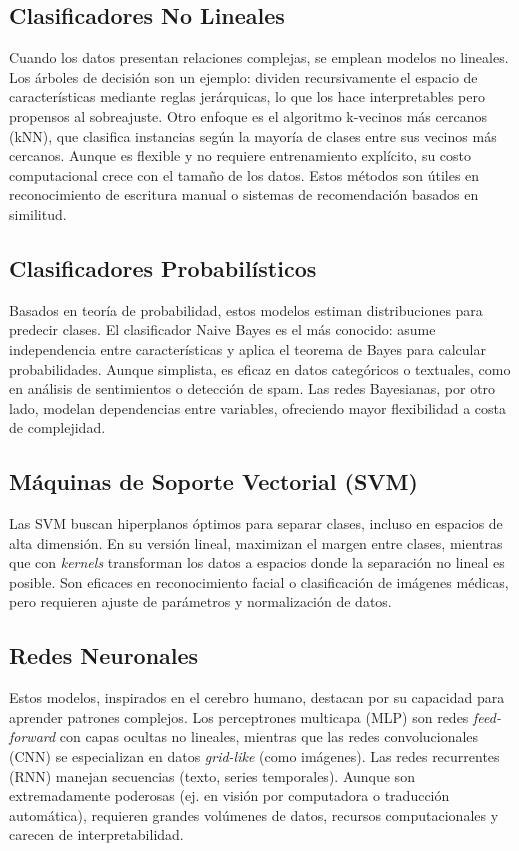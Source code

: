\documentclass{article}
\begin{document}
\subsection{Clasificadores No Lineales}
Cuando los datos presentan relaciones complejas, se emplean modelos no lineales. Los árboles de decisión son un ejemplo: dividen recursivamente el espacio de características mediante reglas jerárquicas, lo que los hace interpretables pero propensos al sobreajuste. Otro enfoque es el algoritmo k-vecinos más cercanos (kNN), que clasifica instancias según la mayoría de clases entre sus vecinos más cercanos. Aunque es flexible y no requiere entrenamiento explícito, su costo computacional crece con el tamaño de los datos. Estos métodos son útiles en reconocimiento de escritura manual o sistemas de recomendación basados en similitud.
\subsection{Clasificadores Probabilísticos}
Basados en teoría de probabilidad, estos modelos estiman distribuciones para predecir clases. El clasificador Naive Bayes es el más conocido: asume independencia entre características y aplica el teorema de Bayes para calcular probabilidades. Aunque simplista, es eficaz en datos categóricos o textuales, como en análisis de sentimientos o detección de spam. Las redes Bayesianas, por otro lado, modelan dependencias entre variables, ofreciendo mayor flexibilidad a costa de complejidad.
\subsection{Máquinas de Soporte Vectorial (SVM)}
Las SVM buscan hiperplanos óptimos para separar clases, incluso en espacios de alta dimensión. En su versión lineal, maximizan el margen entre clases, mientras que con \textit{kernels} transforman los datos a espacios donde la separación no lineal es posible. Son eficaces en reconocimiento facial o clasificación de imágenes médicas, pero requieren ajuste de parámetros y normalización de datos.
\subsection{Redes Neuronales}
Estos modelos, inspirados en el cerebro humano, destacan por su capacidad para aprender patrones complejos. Los perceptrones multicapa (MLP) son redes \textit{feed-forward} con capas ocultas no lineales, mientras que las redes convolucionales (CNN) se especializan en datos \textit{grid-like} (como imágenes). Las redes recurrentes (RNN) manejan secuencias (texto, series temporales). Aunque son extremadamente poderosas (ej. en visión por computadora o traducción automática), requieren grandes volúmenes de datos, recursos computacionales y carecen de interpretabilidad.
\end{document}
